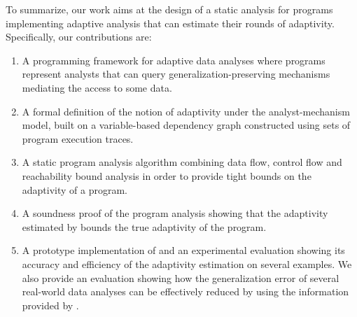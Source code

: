 To summarize, our work aims at the design of a static analysis for programs implementing adaptive analysis that can estimate their rounds of adaptivity. Specifically, our contributions are:
\begin{enumerate}
    \item A programming framework for adaptive data analyses where programs represent analysts that can query generalization-preserving mechanisms mediating the access to some data. 
    \item 
    A formal definition of the notion of adaptivity under the analyst-mechanism model,
    built on a variable-based dependency graph constructed using sets of program execution traces.
    \item 
    A static program analysis algorithm {\THESYSTEM} combining data flow, control flow and  reachability bound analysis in order to provide tight bounds on the adaptivity of a program.
    \item A soundness proof of the program analysis showing that the adaptivity estimated by {\THESYSTEM} bounds the true adaptivity of the program. 
    \item A prototype implementation of {\THESYSTEM} and an experimental evaluation showing its accuracy and efficiency of the adaptivity estimation on several examples.  
    We also provide an evaluation showing how the generalization error of several real-world data analyses can be effectively reduced by using the information provided by {\THESYSTEM}.
\end{enumerate}
